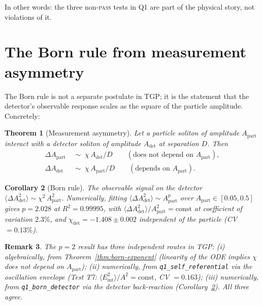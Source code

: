 \documentclass[11pt,a4paper]{article}
\newcommand{\AdetSym}{A_{\mathrm{det}}}
\newcommand{\ApartSym}{A_{\mathrm{part}}}
\newcommand{\chiTGP}{\chi}
\newtheorem{theorem}{Theorem}
\newtheorem{corollary}[theorem]{Corollary}
\newtheorem{remark}[theorem]{Remark}
\begin{document}
In other words: the three non-\textsc{pass} tests in Q1 are part of
the physical story, not violations of it.

\section{The Born rule from measurement asymmetry}\label{sec:born}

The Born rule is not a separate postulate in TGP; it is the statement
that the detector's observable response scales as the square of the
particle amplitude. Concretely:

\begin{theorem}[Measurement asymmetry]\label{thm:asymmetry}
Let a particle soliton of amplitude $\ApartSym$ interact with a
detector soliton of amplitude $\AdetSym$ at separation $D$. Then
\begin{align}\label{eq:asymmetry}
  \Delta\ApartSym &\;\sim\; \chiTGP\,\AdetSym/D
    \qquad (\text{does not depend on } \ApartSym), \\[2pt]
  \Delta\AdetSym  &\;\sim\; \chiTGP\,\ApartSym/D
    \qquad (\text{depends on } \ApartSym).
\end{align}
\end{theorem}

\begin{corollary}[Born rule]\label{cor:born}
The observable signal on the detector
$\langle\Delta\AdetSym^{2}\rangle \sim \chiTGP^{2}\,\ApartSym^{2}$.
Numerically, fitting $\langle\Delta\AdetSym^{2}\rangle\sim\ApartSym^{p}$
over $\ApartSym\in[0.05,0.5]$ gives
$p=2.028$ at $R^{2}=0.99995$, with
$\langle\Delta\AdetSym^{2}\rangle/\ApartSym^{2}=\mathrm{const}$
at coefficient of variation $2.3\%$, and
$\chiTGP_{\mathrm{det}}=-1.408\pm 0.002$ independent of the particle
(CV $=0.13\%$).
\end{corollary}

\begin{remark}
The $p=2$ result has \emph{three} independent routes in TGP:
(i) algebraically, from Theorem~\ref{thm:born-exponent} (linearity of
the ODE implies $\chiTGP$ does not depend on $\ApartSym$);
(ii) numerically, from \verb|q1_self_referential| via the oscillation
envelope (Test T7: $\langle E_{\mathrm{int}}^{2}\rangle/A^{2}=\text{const}$,
CV $=0.163$);
(iii) numerically, from \verb|q1_born_detector| via the detector
back-reaction (Corollary~\ref{cor:born}).
All three agree.
\end{remark}
\end{document}
